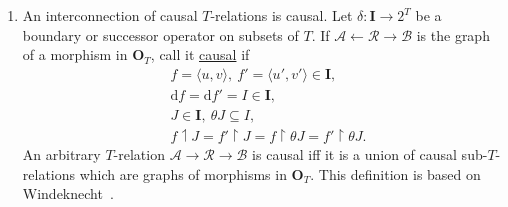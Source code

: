 \documentclass[10pt,a4paper,twocolumn]{article}
\newtheorem*{definition*}{Definition}
\newcommand{\A}{\mathcal{A}}          %
\newcommand{\B}{\mathcal{B}}         %
\newcommand{\Ocat}{\mathbf{O}}          %
\newcommand{\Tcat}{\Ocat_{T}}      %
\newcommand{\Dcat}{\mathbf{D}}          %
\newcommand{\Rcal}{\mathcal{R}}          %
\newcommand{\Iset}{\mathbf{I}}          %
\newcommand{\dom}{\mathrm{d}}            %
\begin{document}
\begin{enumerate}
  \begin{definition*}
    Let $S_{i}\colon D_{i}\to\Ocat$, $i=1,2$ be systems and let $D_{12}$ be
    embedded in $D_{1}$ and $D_{2}$.
    Then $S_{1}$ and $S_{2}$ are \emph{equivalent modulo $D_{12}$} (and the embeddings) iff they have isomorphic (in $\Dcat(\Ocat)$) behaviors modulo $D_{12}$.
  \end{definition*}

  The diagram subscheme appropriate for $T$-relations is $\mathbf{2}$, the two point discrete category.

  \item An interconnection of causal $T$-relations is causal.
  Let $\delta\colon \Iset\to 2^{T}$ be a boundary or successor operator on subsets of $T$.
  If $\A \leftarrow \Rcal \to \B$ is the graph of a morphism in $\Tcat$, call it \underline{causal} if
  \begin{align*}
    & f = \langle u,v\rangle,\ f' = \langle u',v'\rangle \in \Iset,\\
    & \dom f = \dom f' = I\in\Iset,\\
    & J\in\Iset,\ \theta J\subseteq I,\\
    & f\upharpoonleft J = f' \upharpoonright J = f \upharpoonright \theta J = f' \upharpoonright \theta J.
  \end{align*}
  An arbitrary $T$-relation $\A\to\Rcal\to\B$ is causal iff it is a union of causal sub-$T$-relations which are graphs of morphisms in $\Tcat$.
  This definition is based on Windeknecht~\cite{Windeknecht}.


\end{enumerate}
\end{document}
